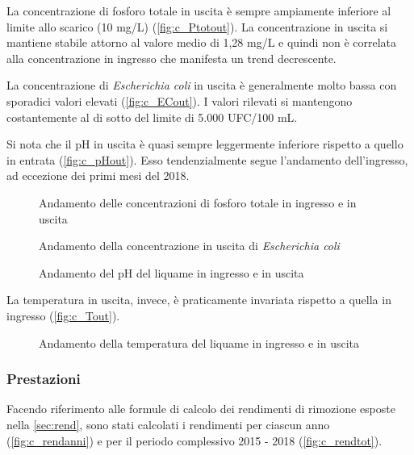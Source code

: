 La concentrazione di fosforo totale in uscita è sempre ampiamente inferiore al limite allo scarico (10 mg/L) (\autoref{fig:c_Ptotout}). 
La concentrazione in uscita si mantiene stabile attorno al valore medio di 1,28 mg/L e quindi non è correlata alla concentrazione in ingresso che manifesta un trend decrescente.

La concentrazione di \textit{Escherichia coli} in uscita è generalmente molto bassa con sporadici valori elevati (\autoref{fig:c_ECout}). I valori rilevati si mantengono costantemente al di sotto del limite di 5.000 UFC/100 mL.

Si nota che il pH in uscita è quasi sempre leggermente inferiore rispetto a quello in entrata (\autoref{fig:c_pHout}). Esso tendenzialmente segue l’andamento dell’ingresso, ad eccezione dei primi mesi del 2018.
\begin{figure}[H]
		\centering
	\caption{Andamento delle concentrazioni di fosforo totale in ingresso e in uscita}
	\label{fig:c_Ptotout}
\end{figure}
\begin{figure}[H]
		\centering
	\caption{Andamento della concentrazione in uscita di \textit{Escherichia coli}}
	\label{fig:c_ECout}
\end{figure}

\begin{figure}[H]
		\centering
	\caption{Andamento del pH del liquame in ingresso e in uscita}
	\label{fig:c_pHout}
\end{figure}


La temperatura in uscita, invece, è praticamente invariata rispetto a quella in ingresso (\autoref{fig:c_Tout}).

\begin{figure}[H]
		\centering
	\caption{Andamento della temperatura del liquame in ingresso e in uscita}
	\label{fig:c_Tout}
\end{figure}\pagebreak

\subsubsection{Prestazioni}

Facendo riferimento alle formule di calcolo dei rendimenti di rimozione esposte nella \autoref{sec:rend}, sono stati calcolati i rendimenti per ciascun anno (\autoref{fig:c_rendanni}) e per il periodo complessivo 2015 - 2018 (\autoref{fig:c_rendtot}).


